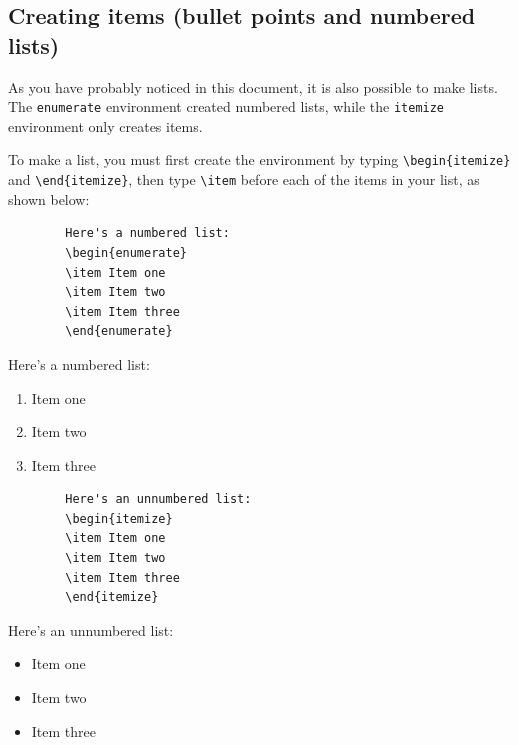 \documentclass[12pts]{article}
\begin{document}
	
	\subsection{Creating items (bullet points and numbered lists)}
	
	As you have probably noticed in this document, it is also possible to make lists. The \texttt{enumerate} environment created numbered lists, while the \texttt{itemize} environment only creates items.
	
	To make a list, you must first create the environment by typing \verb|\begin{itemize}| and \verb|\end{itemize}|, then type \verb|\item| before each of the items in your list, as shown below:
	
	\begin{multicols}{2}
		\begin{Verbatim}
		Here's a numbered list:
		\begin{enumerate}
		\item Item one
		\item Item two
		\item Item three
		\end{enumerate}
		\end{Verbatim}
		
		\columnbreak	
		
		Here's a numbered list:
		\begin{enumerate}
			\item Item one
			\item Item two
			\item Item three
		\end{enumerate}
	\end{multicols}
	
	\begin{multicols}{2}
		\begin{Verbatim}
		Here's an unnumbered list:
		\begin{itemize}
		\item Item one
		\item Item two
		\item Item three
		\end{itemize}
		\end{Verbatim}
		
		\columnbreak	
		
		Here's an unnumbered list:
		\begin{itemize}
			\item Item one
			\item Item two
			\item Item three
		\end{itemize}
	\end{multicols}
	
\end{document}
